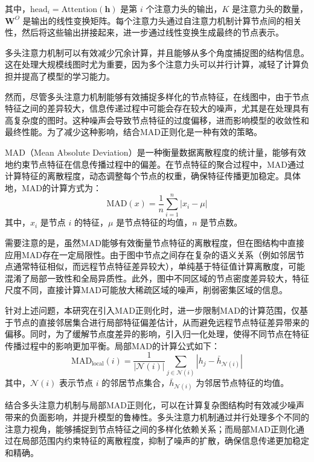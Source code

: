 \documentclass[promaster]{thesis-uestc}
\begin{document}
其中，\(\text{head}_i = \text{Attention}(\mathbf{h})\) 是第 \(i\) 个注意力头的输出，\(K\) 是注意力头的数量，\(\mathbf{W}^O\) 是输出的线性变换矩阵。每个注意力头通过自注意力机制计算节点间的相关性，然后将这些输出拼接起来，进一步通过线性变换生成最终的节点表示。

多头注意力机制可以有效减少冗余计算，并且能够从多个角度捕捉图的结构信息。这在处理大规模线图时尤为重要，因为多个注意力头可以并行计算，减轻了计算负担并提高了模型的学习能力。

然而，尽管多头注意力机制能够有效捕捉多样化的节点特征，在线图中，由于节点特征之间的差异较大，信息传递过程中可能会存在较大的噪声，尤其是在处理具有高复杂度的图时。这种噪声会导致节点特征的过度偏移，进而影响模型的收敛性和最终性能。为了减少这种影响，结合MAD正则化是一种有效的策略。

MAD（Mean Absolute Deviation）是一种衡量数据离散程度的统计量，能够有效地约束节点特征在信息传播过程中的偏差。在节点特征的聚合过程中，MAD通过计算特征的离散程度，动态调整每个节点的权重，确保特征传播更加稳定。具体地，MAD的计算方式为：
\begin{equation}
\text{MAD}(x) = \frac{1}{n} \sum_{i=1}^{n} \left| x_i - \mu \right|
\end{equation}
其中，\( x_i \) 是节点 \( i \) 的特征，\(\mu\) 是节点特征的均值，\(n\) 是节点数。

需要注意的是，虽然MAD能够有效衡量节点特征的离散程度，但在图结构中直接应用MAD存在一定局限性。由于图中节点之间存在复杂的语义关系（例如邻居节点通常特征相似，而远程节点特征差异较大），单纯基于特征值计算离散度，可能混淆了局部一致性和全局异质性。此外，图中不同区域的节点密度差异较大，特征尺度不同，直接计算MAD可能放大稀疏区域的噪声，削弱密集区域的信息。

针对上述问题，本研究在引入MAD正则化时，进一步限制MAD的计算范围，仅基于节点的直接邻居集合进行局部特征偏差估计，从而避免远程节点特征差异带来的偏移。同时，为了缓解节点度差异的影响，引入归一化处理，使得不同节点在特征传播过程中的影响更加平衡。局部MAD的计算公式如下：
\begin{equation}
\text{MAD}_{\text{local}}(i) = \frac{1}{|\mathcal{N}(i)|} \sum_{j \in \mathcal{N}(i)} \left| h_j - \bar{h}_{\mathcal{N}(i)} \right|
\end{equation}
其中，\(\mathcal{N}(i)\) 表示节点 \(i\) 的邻居节点集合，\(\bar{h}_{\mathcal{N}(i)}\) 为邻居节点特征的均值。

结合多头注意力机制与局部MAD正则化，可以在计算复杂图结构时有效减少噪声带来的负面影响，并提升模型的鲁棒性。多头注意力机制通过并行处理多个不同的注意力视角，能够捕捉到节点特征之间的多样化依赖关系；而局部MAD正则化通过在局部范围内约束特征的离散程度，抑制了噪声的扩散，确保信息传递更加稳定和精确。
\end{document}
